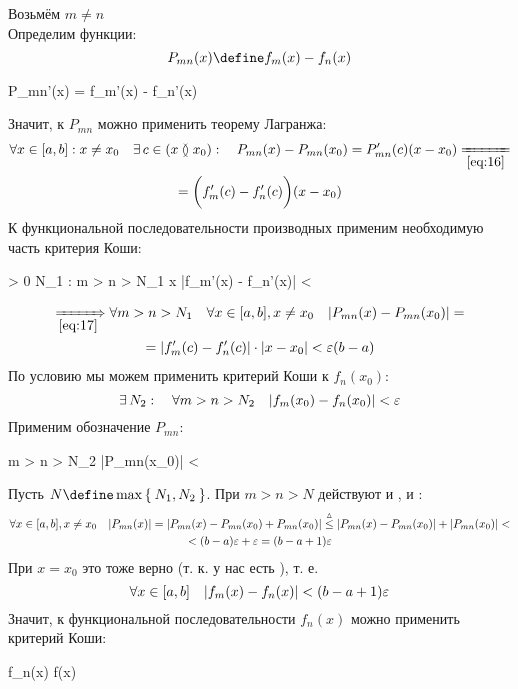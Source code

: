 \begin{iproof}
	\item Возьмём $ m \ne n $ \\
	Определим функции:
	$$ P_{mn}(x) \define f_m(x) - f_n(x) $$
	\begin{equ}{16}
		 \implies \exist P_{mn}'(x) = f_m'(x) - f_n'(x)
	\end{equ}
	Значит, к $ P_{mn} $ можно применить теорему Лагранжа:
	\begin{multline}\lbl{17}
		\forall x \in [a, b] : x \ne x_0 \quad \exist c \in (x \between x_0) : \quad P_{mn}(x) - P_{mn}(x_0) = P_{mn}'(c)(x - x_0) \undereq{\eref{16}} \\
		= \bigg( f_m'(c) - f_n'(c) \bigg)(x - x_0)
	\end{multline}
	К функциональной последовательности производных применим необходимую часть критерия Коши:
	\begin{equ}{18}
		\forall \veps > 0 \quad \exist N_1 : \quad \forall m > n > N_1 \quad \forall x \in [a, b] \quad |f_m'(x) - f_n'(x)| < \veps
	\end{equ}
	\begin{multline}\lbl{19}
		\underimp{\eref{17}} \forall m > n > N_1 \quad \forall x \in [a, b], x \ne x_0 \quad |P_{mn}(x) - P_{mn}(x_0)| = \\
		= |f_m'(c) - f_n'(c)| \cdot |x - x_0| < \veps (b - a)
	\end{multline}
	По условию  мы можем применить критерий Коши к $ f_n(x_0) $:
	$$ \exists\, N_2 : \quad \forall m > n > N_2 \quad |f_m(x_0) - f_n(x_0)| < \varepsilon $$
	Применим обозначение $ P_{mn} $:
	\begin{equ}{20}
		\forall m > n > N_2 \quad |P_{mn}(x_0)| < \veps
	\end{equ}
	Пусть $ N \define \max\set{N_1, N_2} $. При $ m > n > N $ действуют и , и :
	\begin{multline*}
		\forall x \in [a, b], x \ne x_0 \quad |P_{mn}(x)| = |P_{mn}(x) - P_{mn}(x_0) + P_{mn}(x_0)| \stackrel\vartriangle\le |P_{mn}(x) - P_{mn}(x_0)| + |P_{mn}(x_0)| < \\
		< (b - a)\varepsilon + \varepsilon = (b - a + 1)\varepsilon
	\end{multline*}
	При $ x = x_0 $ это тоже верно (т. к. у нас есть ), т. е.
	$$ \forall x \in [a, b] \quad |f_m(x) - f_n(x)| < (b - a + 1)\varepsilon $$
	Значит, к функциональной последовательности $ f_n(x) $ можно применить критерий Коши:
	\begin{equ}{13}
		\implies f_n(x)  f(x)
	\end{equ}

\end{iproof}
